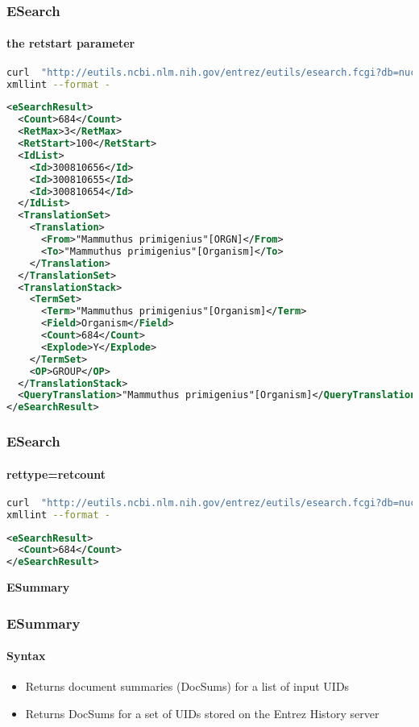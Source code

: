 \documentclass{beamer}
\newcommand{\centeredtitle}[1]{
\begin{center}
    \Huge{\bf{#1}}
\end{center}
}
\newcommand{\hugeslide}[1]{
\begin{frame}
\centeredtitle{#1}
\end{frame}
}
\begin{document}
\begin{frame}[fragile]
\frametitle{ESearch}
\framesubtitle{the retstart parameter }
\begin{lstlisting}[language=bash,basicstyle=\tiny,breaklines=true]
curl  "http://eutils.ncbi.nlm.nih.gov/entrez/eutils/esearch.fcgi?db=nucleotide&term=%22Mammuthus%20primigenius%22%5BORGN%5D&retmax=3&retstart=100" |\
xmllint --format -
\end{lstlisting}

\begin{lstlisting}[language=xml,basicstyle=\tiny,breaklines=false]
<eSearchResult>
  <Count>684</Count>
  <RetMax>3</RetMax>
  <RetStart>100</RetStart>
  <IdList>
    <Id>300810656</Id>
    <Id>300810655</Id>
    <Id>300810654</Id>
  </IdList>
  <TranslationSet>
    <Translation>
      <From>"Mammuthus primigenius"[ORGN]</From>
      <To>"Mammuthus primigenius"[Organism]</To>
    </Translation>
  </TranslationSet>
  <TranslationStack>
    <TermSet>
      <Term>"Mammuthus primigenius"[Organism]</Term>
      <Field>Organism</Field>
      <Count>684</Count>
      <Explode>Y</Explode>
    </TermSet>
    <OP>GROUP</OP>
  </TranslationStack>
  <QueryTranslation>"Mammuthus primigenius"[Organism]</QueryTranslation>
</eSearchResult>
\end{lstlisting}
\end{frame}

\begin{frame}[fragile]
\frametitle{ESearch}
\framesubtitle{rettype=retcount  }
\begin{lstlisting}[language=bash,basicstyle=\tiny,breaklines=true]
curl  "http://eutils.ncbi.nlm.nih.gov/entrez/eutils/esearch.fcgi?db=nucleotide&term=%22Mammuthus%20primigenius%22%5BORGN%5D&rettype=count" |\
xmllint --format -
\end{lstlisting}

\begin{lstlisting}[language=xml,breaklines=false]
<eSearchResult>
  <Count>684</Count>
</eSearchResult>
\end{lstlisting}
\end{frame}


\hugeslide{ESummary}

\begin{frame}[fragile]
\frametitle{ESummary}
\framesubtitle{Syntax}
\begin{itemize}
\item Returns document summaries (DocSums) for a list of input UIDs
\item Returns DocSums for a set of UIDs stored on the Entrez History server
\end{itemize}
\end{frame}
\end{document}

